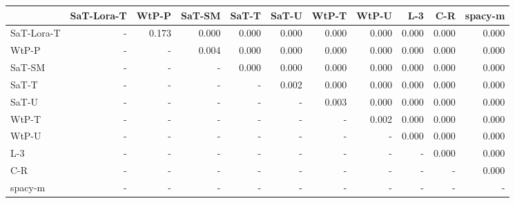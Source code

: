 \begin{tabular}{lrrrrrrrrrr}
\toprule
 & SaT-Lora-T & WtP-P & SaT-SM & SaT-T & SaT-U & WtP-T & WtP-U & L-3 & C-R & spacy-m \\
\midrule
SaT-Lora-T & - & 0.173 & 0.000 & 0.000 & 0.000 & 0.000 & 0.000 & 0.000 & 0.000 & 0.000 \\
WtP-P & - & - & 0.004 & 0.000 & 0.000 & 0.000 & 0.000 & 0.000 & 0.000 & 0.000 \\
SaT-SM & - & - & - & 0.000 & 0.000 & 0.000 & 0.000 & 0.000 & 0.000 & 0.000 \\
SaT-T & - & - & - & - & 0.002 & 0.000 & 0.000 & 0.000 & 0.000 & 0.000 \\
SaT-U & - & - & - & - & - & 0.003 & 0.000 & 0.000 & 0.000 & 0.000 \\
WtP-T & - & - & - & - & - & - & 0.002 & 0.000 & 0.000 & 0.000 \\
WtP-U & - & - & - & - & - & - & - & 0.000 & 0.000 & 0.000 \\
L-3 & - & - & - & - & - & - & - & - & 0.000 & 0.000 \\
C-R & - & - & - & - & - & - & - & - & - & 0.000 \\
spacy-m & - & - & - & - & - & - & - & - & - & - \\
\bottomrule
\end{tabular}

